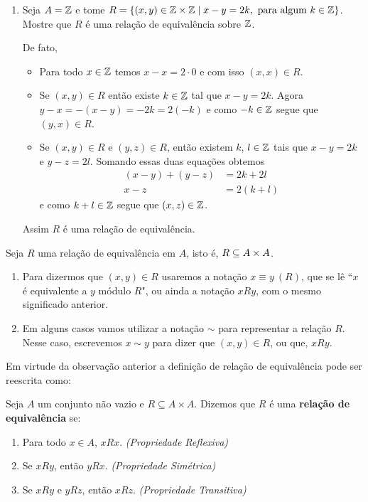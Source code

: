\begin{exemplos}
\begin{enumerate}[label={\arabic*})]
		\item Seja $A = \mathbb{Z}$ e tome $R = \{(x,y)\in \mathbb{Z} \times \mathbb{Z} \mid x - y = 2k, \mbox{ para algum } k \in \mathbb{Z}\}$. Mostre que $R$
		\'e uma rela{\c c}{\~a}o de equival{\^e}ncia sobre $\mathbb{Z}$.
		\begin{solucao}
			De fato,
			\begin{itemize}
				\item Para todo $x\in\mathbb{Z}$ temos $x - x = 2\cdot0$ e com isso $(x,x) \in R$.
				\item Se $(x,y) \in R$ ent\~ao existe $k \in \mathbb{Z}$ tal que $x - y = 2k$. Agora $y - x = -(x - y) = -2k = 2 (-k)$ 
				e como $-k \in \mathbb{Z}$ segue que $(y,x) \in R$.
				\item Se $(x,y) \in R$ e $(y,z) \in R$, ent\~ao existem $k$, $l\in \mathbb{Z}$ tais que $x - y = 2k$ e $y - z = 2l$.
				Somando essas duas equa\c{c}\~oes obtemos
				\begin{align*}
					(x - y) + (y - z) &= 2k + 2l\\
					x - z &= 2(k + l)
				\end{align*}
				e como $k + l \in \mathbb{Z}$ segue que $(x,z) \in \mathbb{Z}$.
			\end{itemize}
			Assim $R$ \'e uma rela\c{c}\~ao de equival\^encia.
		\end{solucao}
	\end{enumerate}
\end{exemplos}
\begin{observacoes}
	Seja $R$ uma rela{\c c}{\~a}o de equival{\^e}ncia em $A$, isto \'e, $R \subseteq A \times A$.
	\begin{enumerate}[label={\arabic*})]
		\item  Para dizermos que $(x,y) \in R$ usaremos a nota{\c c}{\~a}o $x\equiv y\ (R)$, que se l{\^e} ``$x$ \'e equivalente a $y$ m{\'o}dulo $R$", ou ainda a nota{\c c}{\~a}o $xRy$, com o mesmo significado anterior.
		\item Em alguns casos vamos utilizar a nota\c{c}\~ao $\sim$ para representar a rela\c{c}\~ao $R$. Nesse caso, escrevemos $x \sim y$ para dizer que $(x, y) \in R$, ou que, $xRy$.
	\end{enumerate}
\end{observacoes}

Em virtude da observa\c{c}\~ao anterior a defini\c{c}\~ao de rela\c{c}\~ao de equival\^encia pode ser reescrita como:

\begin{definicao}
	Seja $A$ um conjunto n{\~a}o vazio e $R\subseteq A \times A$. Dizemos que $R$ {\'e} uma \textbf{rela{\c c}{\~a}o de equival{\^e}ncia} se:
	\begin{enumerate}[label={\roman*})]
		\item Para todo $x \in A$, $xRx$. \textit{(Propriedade Reflexiva)}
		\item Se $xRy$, ent\~ao $yRx$. \textit{(Propriedade Sim\'etrica)}
		\item Se $xRy$ e $yRz$, ent\~ao $xRz$. \textit{(Propriedade Transitiva)}
	\end{enumerate}
\end{definicao}

